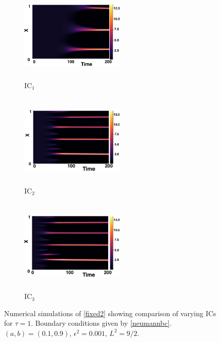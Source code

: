 \begin{figure}[H]
    \centering
    \begin{subfigure}[b]{0.32\textwidth}
        \centering
        \includegraphics[width=5cm,height=4.5cm]{gaff1.png}
        \caption{$\text{IC}_1$}
        \label{}
    \end{subfigure}
    \hfill
    \begin{subfigure}[b]{0.32\textwidth}
        \centering
        \includegraphics[width=5cm,height=4.5cm]{ic21.png}
        \caption{$\text{IC}_2$}
        \label{}
    \end{subfigure}
    \hfill
    \begin{subfigure}[b]{0.32\textwidth}
        \centering
        \includegraphics[width=5cm,height=4.5cm]{ic31.png}
        \caption{$\text{IC}_3$}
        \label{}
    \end{subfigure}
    \caption{Numerical simulations of \eqref{fixed2} showing comparison of varying ICs for $\tau=1$. Boundary conditions given by \eqref{neumannbc}. $(a,b)=(0.1,0.9)$, $\epsilon^2=0.001$, $L^2=9/2$.}
    \label{fig:figtau1}
\end{figure}
